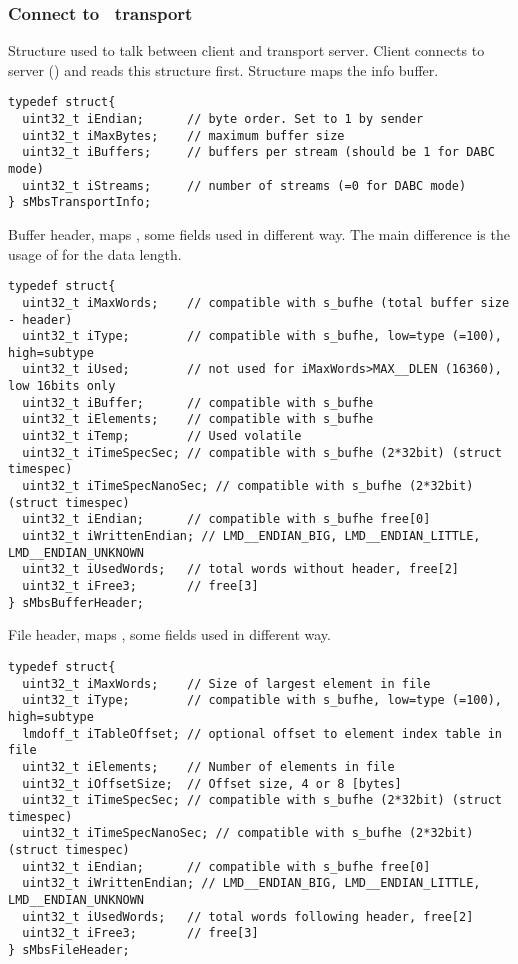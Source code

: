 \subsubsection{Connect to \mbs\ transport}
Structure used to talk between client and transport server.
Client connects to server (\mbs) and reads this structure first.
Structure maps the  info buffer.
{\small \begin{verbatim}
typedef struct{
  uint32_t iEndian;      // byte order. Set to 1 by sender 
  uint32_t iMaxBytes;    // maximum buffer size                   
  uint32_t iBuffers;     // buffers per stream (should be 1 for DABC mode)
  uint32_t iStreams;     // number of streams (=0 for DABC mode)                   
} sMbsTransportInfo;
\end{verbatim}
}

Buffer header, maps , some fields used in different way.
The main difference is the usage of  for the data length.
{\small \begin{verbatim}
typedef struct{
  uint32_t iMaxWords;    // compatible with s_bufhe (total buffer size - header)
  uint32_t iType;        // compatible with s_bufhe, low=type (=100), high=subtype
  uint32_t iUsed;        // not used for iMaxWords>MAX__DLEN (16360), low 16bits only
  uint32_t iBuffer;      // compatible with s_bufhe
  uint32_t iElements;    // compatible with s_bufhe
  uint32_t iTemp;        // Used volatile
  uint32_t iTimeSpecSec; // compatible with s_bufhe (2*32bit) (struct timespec)
  uint32_t iTimeSpecNanoSec; // compatible with s_bufhe (2*32bit) (struct timespec)
  uint32_t iEndian;      // compatible with s_bufhe free[0]
  uint32_t iWrittenEndian; // LMD__ENDIAN_BIG, LMD__ENDIAN_LITTLE, LMD__ENDIAN_UNKNOWN
  uint32_t iUsedWords;   // total words without header, free[2]
  uint32_t iFree3;       // free[3]
} sMbsBufferHeader;
\end{verbatim}
}
File header, maps , some fields used in different way.
{\small \begin{verbatim}
typedef struct{
  uint32_t iMaxWords;    // Size of largest element in file
  uint32_t iType;        // compatible with s_bufhe, low=type (=100), high=subtype
  lmdoff_t iTableOffset; // optional offset to element index table in file
  uint32_t iElements;    // Number of elements in file
  uint32_t iOffsetSize;  // Offset size, 4 or 8 [bytes]
  uint32_t iTimeSpecSec; // compatible with s_bufhe (2*32bit) (struct timespec)
  uint32_t iTimeSpecNanoSec; // compatible with s_bufhe (2*32bit) (struct timespec)
  uint32_t iEndian;      // compatible with s_bufhe free[0]
  uint32_t iWrittenEndian; // LMD__ENDIAN_BIG, LMD__ENDIAN_LITTLE, LMD__ENDIAN_UNKNOWN
  uint32_t iUsedWords;   // total words following header, free[2]
  uint32_t iFree3;       // free[3]
} sMbsFileHeader;
\end{verbatim}
}
